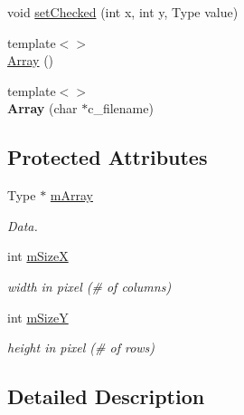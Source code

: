 \begin{DoxyCompactItemize}
void \hyperlink{classArray_a0771ab62914ae3723784815751d7a2c9}{set\+Checked} (int x, int y, Type value)
\item 
{\footnotesize template$<$$>$ }\\\hyperlink{classArray_a2de93fd0717cb71fab6b087888f9c998}{Array} ()
\item 
{\footnotesize template$<$$>$ }\\{\bfseries Array} (char $\ast$c\+\_\+filename)\hypertarget{classArray_a5f3bcbe4231e7dc212ccc1179f617fa5}{}\label{classArray_a5f3bcbe4231e7dc212ccc1179f617fa5}

\end{DoxyCompactItemize}
\subsection*{Protected Attributes}
\begin{DoxyCompactItemize}
\item 
Type $\ast$ \hyperlink{classArray_affb319cd36f1fd11f2ecab60cd0a8c7d}{m\+Array}\hypertarget{classArray_affb319cd36f1fd11f2ecab60cd0a8c7d}{}\label{classArray_affb319cd36f1fd11f2ecab60cd0a8c7d}

\begin{DoxyCompactList}\small\item\em Data. \end{DoxyCompactList}\item 
int \hyperlink{classArray_a0004de2d1c6d20947fe38ea637896463}{m\+SizeX}\hypertarget{classArray_a0004de2d1c6d20947fe38ea637896463}{}\label{classArray_a0004de2d1c6d20947fe38ea637896463}

\begin{DoxyCompactList}\small\item\em width in pixel (\# of columns) \end{DoxyCompactList}\item 
int \hyperlink{classArray_a6a2d93b9ef89333a15d988c786c23644}{m\+SizeY}\hypertarget{classArray_a6a2d93b9ef89333a15d988c786c23644}{}\label{classArray_a6a2d93b9ef89333a15d988c786c23644}

\begin{DoxyCompactList}\small\item\em height in pixel (\# of rows) \end{DoxyCompactList}\end{DoxyCompactItemize}


\subsection{Detailed Description}

